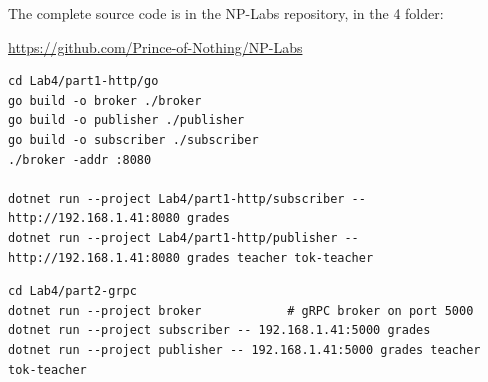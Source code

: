 \documentclass[12pt,a4paper]{article}
\begin{document}
The complete source code is in the NP-Labs repository, in the 4 folder:
\begin{center}
\large
\url{https://github.com/Prince-of-Nothing/NP-Labs}
\end{center}

\begin{lstlisting}[caption={Build and start the HTTP broker and clients.}]
cd Lab4/part1-http/go
go build -o broker ./broker
go build -o publisher ./publisher
go build -o subscriber ./subscriber
./broker -addr :8080

dotnet run --project Lab4/part1-http/subscriber -- http://192.168.1.41:8080 grades
dotnet run --project Lab4/part1-http/publisher -- http://192.168.1.41:8080 grades teacher tok-teacher
\end{lstlisting}

\begin{lstlisting}[caption={Build and start the gRPC broker and clients.}]
cd Lab4/part2-grpc
dotnet run --project broker            # gRPC broker on port 5000
dotnet run --project subscriber -- 192.168.1.41:5000 grades
dotnet run --project publisher -- 192.168.1.41:5000 grades teacher tok-teacher
\end{lstlisting}
\end{document}
